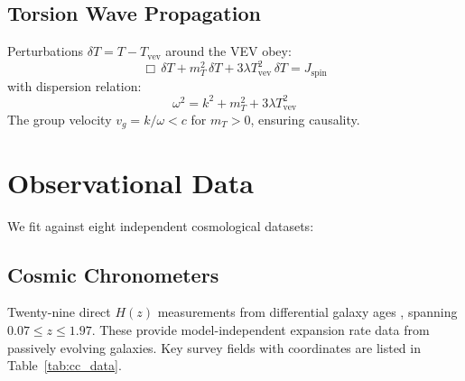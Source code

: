 \documentclass[twocolumn,prd,superscriptaddress,nofootinbib]{revtex4-2}
\begin{document}
\subsection{Torsion Wave Propagation}

Perturbations $\delta T = T - T_\text{vev}$ around the VEV obey:
\begin{equation}
\Box\,\delta T + m_T^2\,\delta T + 3\lambda T_\text{vev}^2\,\delta T = J_\text{spin}
\label{eq:wave_eq}
\end{equation}
with dispersion relation:
\begin{equation}
\omega^2 = k^2 + m_T^2 + 3\lambda T_\text{vev}^2
\label{eq:dispersion}
\end{equation}
The group velocity $v_g = k/\omega < c$ for $m_T > 0$, ensuring causality.

\section{Observational Data}
\label{sec:data}

We fit against eight independent cosmological datasets:

\subsection{Cosmic Chronometers}

Twenty-nine direct $H(z)$ measurements from differential galaxy ages \cite{Moresco2016,Simon2005,Zhang2014,Stern2010,Moresco2012,Moresco2015}, spanning $0.07 \leq z \leq 1.97$. These provide model-independent expansion rate data from passively evolving galaxies. Key survey fields with coordinates are listed in Table~\ref{tab:cc_data}.
\end{document}
